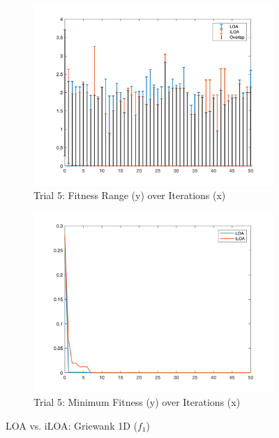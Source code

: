 \begin{figure}
  \begin{subfigure}[b]{0.4\textwidth}
    \includegraphics[width=\textwidth]{img/bars/f1/5}
    \caption{ \scriptsize Trial 5: Fitness Range (y) over Iterations (x)}
    \label{fig:f1-b-5}
  \end{subfigure}
  \begin{subfigure}[b]{0.4\textwidth}
    \includegraphics[width=\textwidth]{img/fits/f1/5}
    \caption{ \scriptsize Trial 5: Minimum Fitness (y) over Iterations (x)}
    \label{fig:f1-f-5}
  \end{subfigure}

  \caption{ \scriptsize LOA vs. iLOA: Griewank 1D ($f_1$)}
\end{figure}
